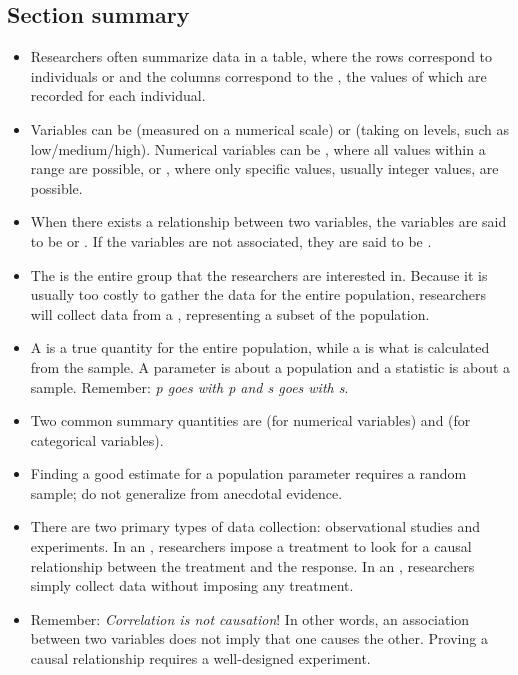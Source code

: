 \subsection*{Section summary}
\begin{itemize}
\item Researchers often summarize data in a table, where the rows correspond to individuals or  and the columns correspond to the , the values of which are recorded for each individual.

\item Variables can be  (measured on a numerical scale) or  (taking on levels, such as low/medium/high).  Numerical variables can be , where all values within a range are possible, or , where only specific  values, usually integer values, are possible.

\item When there exists a relationship between two variables, the variables are said to be  or .  If the variables are not associated, they are said to be .

\end{itemize}


\begin{itemize}
\item The  is the entire group that the researchers are interested in.  Because it is usually too costly to gather the data for the entire population, researchers will collect data from a , representing a subset of the population.

\item A  is a true quantity for the entire population, while a  is what is calculated from the sample.  A parameter is about a population and a statistic is about a sample.  Remember: \textit{p goes with p and s goes with s}.  

\item Two common summary quantities are  (for numerical variables) and  (for categorical variables).  

\item Finding a good estimate for a population parameter requires a random sample; do not generalize from anecdotal evidence.  

\item There are two primary types of data collection:  observational studies and experiments.  In an , researchers impose a treatment to look for a causal relationship between the treatment and the response.  In an , researchers simply collect data without imposing any treatment.

\item Remember:  \textit{Correlation is not causation}!  In other words, an association between two variables does not imply that one causes the other.  Proving a causal relationship requires a well-designed experiment.
  
\end{itemize}

